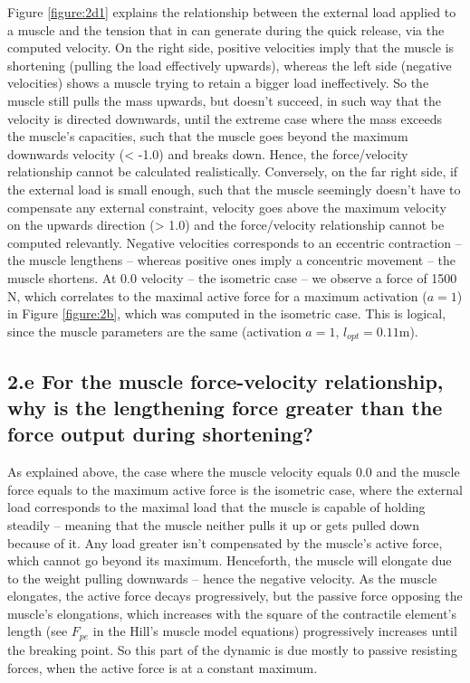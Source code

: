 \documentclass{cmc}
\begin{document}
Figure \ref{figure:2d1} explains the relationship between the external load applied to a muscle and the tension that in can generate during the quick release, via the computed velocity. On the right side, positive velocities imply that the muscle is shortening (pulling the load effectively upwards), whereas the left side (negative velocities) shows a muscle trying to retain a bigger load ineffectively. So the muscle still pulls the mass upwards, but doesn't succeed, in such way that the velocity is directed downwards, until the extreme case where the mass exceeds the muscle's capacities, such that the muscle goes beyond the maximum downwards velocity (< -1.0) and breaks down. Hence, the force/velocity relationship cannot be calculated realistically. Conversely, on the far right side, if the external load is small enough, such that the muscle seemingly doesn't have to compensate any external constraint, velocity goes above the maximum velocity on the upwards direction (> 1.0) and the force/velocity relationship cannot be computed relevantly. Negative velocities corresponds to an eccentric contraction -- the muscle lengthens -- whereas positive ones imply a concentric movement -- the muscle shortens. At 0.0 velocity -- the isometric case -- we observe a force of 1500 N, which correlates to the maximal active force for a maximum activation ($a=1$) in Figure \ref{figure:2b}, which was computed in the isometric case. This is logical, since the muscle parameters are the same (activation $a=1$, $l_{opt}=0.11$m).

\subsection*{2.e For the muscle force-velocity relationship, why is
  the lengthening force greater than the force output during
  shortening?}

As explained above, the case where the muscle velocity equals 0.0 and the muscle force equals to the maximum active force is the isometric case, where the external load corresponds to the maximal load that the muscle is capable of holding steadily -- meaning that the muscle neither pulls it up or gets pulled down because of it. Any load greater isn't compensated by the muscle's active force, which cannot go beyond its maximum. Henceforth, the muscle will elongate due to the weight pulling downwards -- hence the negative velocity. As the muscle elongates, the active force decays progressively, but the passive force opposing the muscle's elongations, which increases with the square of the contractile element's length (see $F_{pe}$ in the Hill's muscle model equations) progressively increases until the breaking point. So this part of the dynamic is due mostly to passive resisting forces, when the active force is at a constant maximum.
\end{document}
